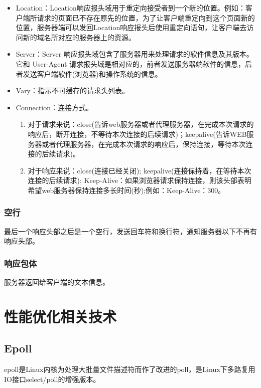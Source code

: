 \documentclass[bachelor]{thesis-uestc}
\begin{document}
\begin{itemize}
	\item Location：Location响应报头域用于重定向接受者到一个新的位置。例如：客户端所请求的页面已不存在原先的位置，为了让客户端重定向到这个页面新的位置，服务器端可以发回Location响应报头后使用重定向语句，让客户端去访问新的域名所对应的服务器上的资源。
	\item Server：Server 响应报头域包含了服务器用来处理请求的软件信息及其版本。它和 User-Agent 请求报头域是相对应的，前者发送服务器端软件的信息，后者发送客户端软件(浏览器)和操作系统的信息。
	\item Vary：指示不可缓存的请求头列表。
	\item Connection：连接方式。
	\begin{enumerate}
		\item 对于请求来说：close(告诉web服务器或者代理服务器，在完成本次请求的响应后，断开连接，不等待本次连接的后续请求)；keepalive(告诉WEB服务器或者代理服务器，在完成本次请求的响应后，保持连接，等待本次连接的后续请求)。
		\item 对于响应来说：close(连接已经关闭); keepalive(连接保持着，在等待本次连接的后续请求); Keep-Alive：如果浏览器请求保持连接，则该头部表明希望web服务器保持连接多长时间(秒);例如：Keep-Alive：300。
	\end{enumerate}
\end{itemize}

\subsubsection*{空行}

最后一个响应头部之后是一个空行，发送回车符和换行符，通知服务器以下不再有响应头部。

\subsubsection*{响应包体}

服务器返回给客户端的文本信息。

\section{性能优化相关技术}


\subsection{Epoll}

epoll是Linux内核为处理大批量文件描述符而作了改进的poll，是Linux下多路复用IO接口select/poll的增强版本。
\end{document}
